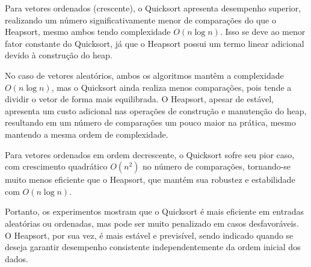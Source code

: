 \documentclass[12pt]{article}
\begin{document}
Para vetores ordenados (crescente), o Quicksort apresenta desempenho superior, realizando um número significativamente menor de comparações do que o Heapsort, mesmo ambos tendo complexidade $O(n \log n)$. Isso se deve ao menor fator constante do Quicksort, já que o Heapsort possui um termo linear adicional devido à construção do heap.

No caso de vetores aleatórios, ambos os algoritmos mantêm a complexidade $O(n \log n)$, mas o Quicksort ainda realiza menos comparações, pois tende a dividir o vetor de forma mais equilibrada. O Heapsort, apesar de estável, apresenta um custo adicional nas operações de construção e manutenção do heap, resultando em um número de comparações um pouco maior na prática, mesmo mantendo a mesma ordem de complexidade.

Para vetores ordenados em ordem decrescente, o Quicksort sofre seu pior caso, com crescimento quadrático $O(n^2)$ no número de comparações, tornando-se muito menos eficiente que o Heapsort, que mantém sua robustez e estabilidade com $O(n \log n)$.

Portanto, os experimentos mostram que o Quicksort é mais eficiente em entradas aleatórias ou ordenadas, mas pode ser muito penalizado em casos desfavoráveis. O Heapsort, por sua vez, é mais estável e previsível, sendo indicado quando se deseja garantir desempenho consistente independentemente da ordem inicial dos dados.
\end{document}
